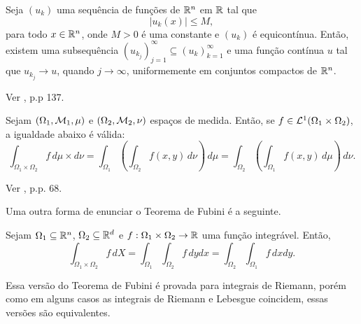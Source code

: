 
\begin{tbox} \label{thm:arzela}
    Seja $(u_k)$ uma sequência de funções de $\mathbb{R}^n$ em $\mathbb{R}$ tal que
    \[
        |u_k(x)| \leqslant M,
    \]
    para todo $x \in \mathbb{R}^n$, onde $M >0$ é uma constante e $(u_k)$ é equicontínua\footnotemark.
    Então, existem uma subsequência $(u_{k_j})_{j =1}^\infty \subseteq (u_k)_{k=1}^\infty$ e uma função contínua $u$ tal que $u_{k_j} \to u$, quando $j \to \infty$, uniformemente em conjuntos compactos de $\mathbb{R}^n$.
\end{tbox}
\begin{prf}
    Ver \cite{folland-real.analysis}, p.p 137.
\end{prf}


\begin{tbox} \label{thm:fubini}
    Sejam $(\Omega_1, \mathcal{M}_1, \mu)$ e $(\Omega_2, \mathcal{M}_2, \nu)$ espaços de medida.
    Então, se $f \in \mathcal{L}^1(\Omega_1 \times \Omega_2)$, a igualdade abaixo é válida:
    \[
        \int_{\Omega_1 \times \Omega_2} f \, d\mu \times d\nu = \int_{\Omega_1} \left( \int_{\Omega_2} f(x,y) \,d \nu \right) \, d\mu = \int_{\Omega_2} \left( \int_{\Omega_1} f(x,y) \,d\mu \right) \,d\nu.
    \]
\end{tbox}
\begin{prf}
    Ver \cite{folland-real.analysis}, p.p. 68.
\end{prf}

Uma outra forma de enunciar o Teorema de Fubini é a seguinte.
\begin{tbox}
    Sejam $\Omega_1 \subseteq \mathbb{R}^n$, $\Omega_2  \subseteq \mathbb{R}^d$ e $f : \Omega_1 \times \Omega_2 \to \mathbb{R}$ uma função integrável.
Então,
\[
    \int_{\Omega_1 \times \Omega_2} f \,dX = \int_{\Omega_1} \int_{\Omega_2} f \, dydx = \int_{\Omega_2} \int_{\Omega_1} f \,dxdy.
\]
\end{tbox}

Essa versão do Teorema de Fubini é provada para integrais de Riemann, porém como em alguns casos as integrais de Riemann e Lebesgue coincidem, essas versões são equivalentes.


